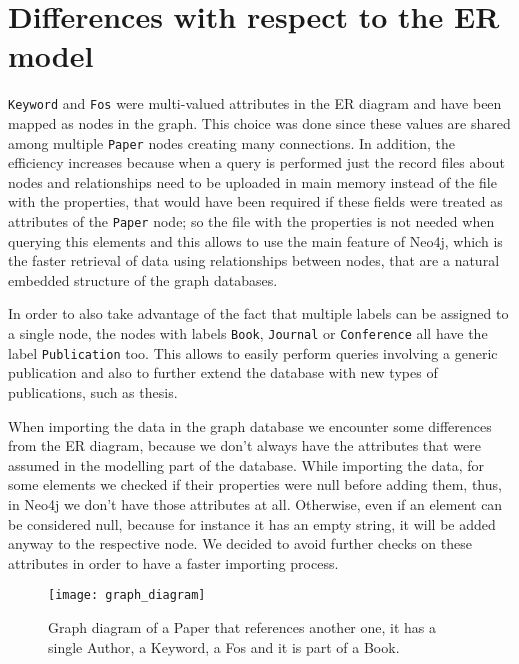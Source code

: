 \section{Differences with respect to the ER model}
\label{sec:differences_with_respect_to_the_er_model}%
\verb|Keyword| and \verb|Fos| were multi-valued attributes in the ER diagram and have been mapped as nodes in the graph.
This choice was done since these values are shared among multiple \verb|Paper| nodes creating many connections.
In addition, the efficiency increases because when a query is performed just the record files about nodes and relationships need to be uploaded in main memory instead of the file with the properties, that would have been required if these fields were treated as attributes of the \verb|Paper| node;
so the file with the properties is not needed when querying this elements and this allows to use the main feature of Neo4j, which is the faster retrieval of data using relationships between nodes, that are a natural embedded structure of the graph databases.

In order to also take advantage of the fact that multiple labels can be assigned to a single node, the nodes with labels \verb|Book|, \verb|Journal| or \verb|Conference| all have the label \verb|Publication| too.
This allows to easily perform queries involving a generic publication and also to further extend the database with new types of publications, such as thesis.

When importing the data in the graph database we encounter some differences from the ER diagram, because we don't always have the attributes that were assumed in the modelling part of the database.
While importing the data, for some elements we checked if their properties were null before adding them, thus, in Neo4j we don't have those attributes at all.
Otherwise, even if an element can be considered null, because for instance it has an empty string, it will be added anyway to the respective node.
We decided to avoid further checks on these attributes in order to have a faster importing process.
\begin{figure}[H]
    \begin{center}
        \texttt{[image: graph\_diagram]}
        \caption{Graph diagram of a Paper that references another one, it has a single Author, a Keyword, a Fos and it is part of a Book.}
        \label{fig:graph_diagram}%
    \end{center}
\end{figure}

